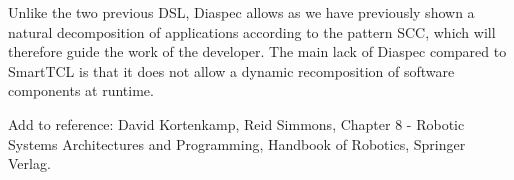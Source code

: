 \begin{enumerate}
Unlike the two previous DSL, Diaspec allows as we have previously shown a natural decomposition of applications according to the pattern SCC, which will therefore guide the work of the developer. The main lack of Diaspec compared to SmartTCL is that it does not allow a dynamic recomposition of software components at runtime.

\end{enumerate}
Add to reference: David Kortenkamp, Reid Simmons, Chapter 8 - Robotic Systems Architectures and Programming, Handbook of Robotics, Springer Verlag.~\cite{Kort08a}
